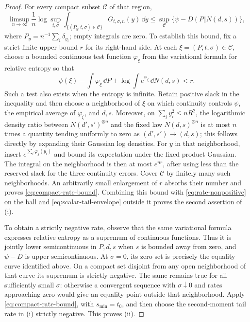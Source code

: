 \begin{proof}
For every compact subset $\mathcal C$ of that region,
\begin{equation}
 \limsup_{n\to\infty}\frac1n\log
 \sup_{t,\sigma}\int_{\{(P_y,t,\sigma)\in\mathcal C\}}
 G_{t,\sigma,n}(y)\,\dd y
 \le\sup_{\mathcal C}\bigl\{\psi-D(P\Vert N(d,s))\bigr\},
 \label{eq:compact-rate-bound}
\end{equation}
where $P_y=n^{-1}\sum_i\delta_{y_i}$; empty integrals are zero.
To establish this bound, fix a strict finite upper bound $r$ for its
right-hand side. At each $\xi=(P,t,\sigma)\in\mathcal C$, choose a
bounded continuous test function $\varphi_\xi$ from the variational
formula for relative entropy so that
\[
 \psi(\xi)-\int\varphi_\xi\,\dd P
       +\log\int e^{\varphi_\xi}\,\dd N(d,s)<r.
\]
Such a test also exists when the entropy is infinite. Retain positive
slack in the inequality and then choose a neighborhood of $\xi$ on
which continuity controls $\psi$, the empirical average of
$\varphi_\xi$, and $d,s$.  Moreover, on
$\sum_i y_i^2\le nR^2$, the logarithmic density ratio between
$N(d',s')^{\otimes n}$ and the fixed law $N(d,s)^{\otimes n}$ is at
most $n$ times a quantity tending uniformly to zero as
$(d',s')\to(d,s)$; this follows directly by expanding their Gaussian
log densities.  For $y$ in that neighborhood, insert
$e^{\sum_i\varphi_\xi(y_i)}$ and bound its expectation under the
fixed product Gaussian.  The integral on the neighborhood is then at
most $e^{nr}$, after using less than the reserved slack for the three
continuity errors. Cover $\mathcal C$ by finitely many such
neighborhoods. An arbitrarily
small enlargement of $r$ absorbs their number and proves
\eqref{eq:compact-rate-bound}. Combining this bound with
\eqref{eq:rate-nonpositive} on the ball and
\eqref{eq:scalar-tail-envelope} outside it proves the second assertion
of \textup{(i)}.

To obtain a strictly negative rate, observe that the same variational
formula expresses relative entropy as a supremum of continuous
functions. Thus it is jointly lower semicontinuous in $P,d,s$ when
$s$ is bounded away from zero, and $\psi-D$ is upper semicontinuous.
At $\sigma=0$, its zero set is precisely the equality curve identified
above.  On a compact set disjoint from any open neighborhood of that
curve its supremum is strictly negative.  The same remains true for
all sufficiently small $\sigma$: otherwise a convergent sequence with
$\sigma\downarrow0$ and rates approaching zero would give an equality
point outside that neighborhood.  Apply
\eqref{eq:compact-rate-bound}, with $s_{\min}=t_0$, and then choose the
second-moment tail rate in \textup{(i)} strictly negative.  This proves
\textup{(ii)}.


\end{proof}
